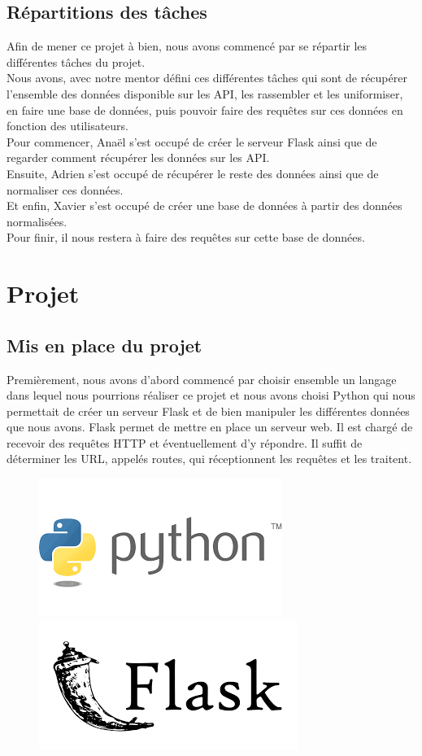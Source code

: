 \documentclass{article}
\begin{document}
\subsection{Répartitions des tâches}
Afin de mener ce projet à bien, nous avons commencé par se répartir les différentes tâches du projet.\\
Nous avons, avec notre mentor défini ces différentes tâches qui sont de récupérer l’ensemble des données disponible sur les API, les rassembler et les uniformiser, en faire une base de données, puis pouvoir faire des requêtes sur ces données en fonction des utilisateurs.\\
Pour commencer, Anaël s’est occupé de créer le serveur Flask ainsi que de regarder comment récupérer les données sur les API.\\
Ensuite, Adrien s’est occupé de récupérer le reste des données ainsi que de normaliser ces données.\\
Et enfin, Xavier s’est occupé de créer une base de données à partir des données normalisées.\\
Pour finir, il nous restera à faire des requêtes sur cette base de données.
\newpage

\section{Projet}

\subsection{Mis en place du projet}
Premièrement, nous avons d’abord commencé par choisir ensemble un langage dans lequel nous pourrions réaliser ce projet et nous avons choisi Python qui nous permettait de créer un serveur Flask et de bien manipuler les différentes données que nous avons. Flask permet de mettre en place un serveur web. Il est chargé de recevoir des requêtes HTTP et éventuellement d’y répondre. Il suffit de déterminer les URL, appelés routes, qui réceptionnent les requêtes et les traitent.
\begin{figure}[H]
\hspace{-0mm}
\includegraphics[scale = 0.55]{images/python.png}
\hspace{10mm}
\includegraphics[scale = 0.5]{images/flask_logo.png}
\end{figure}
\end{document}
